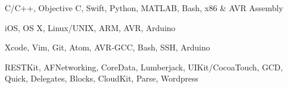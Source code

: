 

\begin{cvskills}


    {C/C++, Objective C, Swift, Python, MATLAB, Bash, x86 \& AVR Assembly}

    {iOS, OS X, Linux/UNIX, ARM, AVR, Arduino}

    {Xcode, Vim, Git, Atom, AVR-GCC, Bash, SSH, Arduino}


    {RESTKit, AFNetworking, CoreData, Lumberjack, UIKit/CocoaTouch, GCD, Quick, Delegates, Blocks, CloudKit, Parse, Wordpress}

\end{cvskills}

